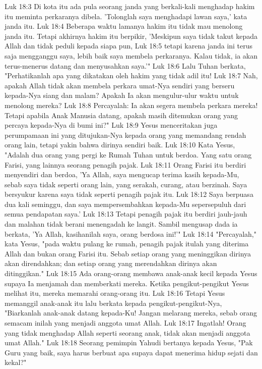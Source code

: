 Luk 18:3  Di kota itu ada pula seorang janda yang berkali-kali menghadap hakim itu meminta perkaranya dibela. 'Tolonglah saya menghadapi lawan saya,' kata janda itu.
Luk 18:4  Beberapa waktu lamanya hakim itu tidak mau menolong janda itu. Tetapi akhirnya hakim itu berpikir, 'Meskipun saya tidak takut kepada Allah dan tidak peduli kepada siapa pun,
Luk 18:5  tetapi karena janda ini terus saja mengganggu saya, lebih baik saya membela perkaranya. Kalau tidak, ia akan terus-menerus datang dan menyusahkan saya.'"
Luk 18:6  Lalu Tuhan berkata, "Perhatikanlah apa yang dikatakan oleh hakim yang tidak adil itu!
Luk 18:7  Nah, apakah Allah tidak akan membela perkara umat-Nya sendiri yang berseru kepada-Nya siang dan malam? Apakah Ia akan mengulur-ulur waktu untuk menolong mereka?
Luk 18:8  Percayalah: Ia akan segera membela perkara mereka! Tetapi apabila Anak Manusia datang, apakah masih ditemukan orang yang percaya kepada-Nya di bumi ini?"
Luk 18:9  Yesus menceritakan juga perumpamaan ini yang ditujukan-Nya kepada orang yang memandang rendah orang lain, tetapi yakin bahwa dirinya sendiri baik.
Luk 18:10  Kata Yesus, "Adalah dua orang yang pergi ke Rumah Tuhan untuk berdoa. Yang satu orang Farisi, yang lainnya seorang penagih pajak.
Luk 18:11  Orang Farisi itu berdiri menyendiri dan berdoa, 'Ya Allah, saya mengucap terima kasih kepada-Mu, sebab saya tidak seperti orang lain, yang serakah, curang, atau berzinah. Saya bersyukur karena saya tidak seperti penagih pajak itu.
Luk 18:12  Saya berpuasa dua kali seminggu, dan saya mempersembahkan kepada-Mu sepersepuluh dari semua pendapatan saya.'
Luk 18:13  Tetapi penagih pajak itu berdiri jauh-jauh dan malahan tidak berani menengadah ke langit. Sambil mengusap dada ia berkata, 'Ya Allah, kasihanilah saya, orang berdosa ini!'"
Luk 18:14  "Percayalah," kata Yesus, "pada waktu pulang ke rumah, penagih pajak itulah yang diterima Allah dan bukan orang Farisi itu. Sebab setiap orang yang meninggikan dirinya akan direndahkan; dan setiap orang yang merendahkan dirinya akan ditinggikan."
Luk 18:15  Ada orang-orang membawa anak-anak kecil kepada Yesus supaya Ia menjamah dan memberkati mereka. Ketika pengikut-pengikut Yesus melihat itu, mereka memarahi orang-orang itu.
Luk 18:16  Tetapi Yesus memanggil anak-anak itu lalu berkata kepada pengikut-pengikut-Nya, "Biarkanlah anak-anak datang kepada-Ku! Jangan melarang mereka, sebab orang semacam inilah yang menjadi anggota umat Allah.
Luk 18:17  Ingatlah! Orang yang tidak menghadap Allah seperti seorang anak, tidak akan menjadi anggota umat Allah."
Luk 18:18  Seorang pemimpin Yahudi bertanya kepada Yesus, "Pak Guru yang baik, saya harus berbuat apa supaya dapat menerima hidup sejati dan kekal?"
